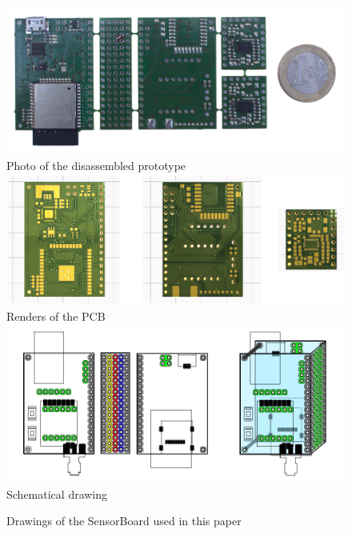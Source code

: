 \begin{figure}
	\centering
	\caption{Drawings of the SensorBoard used in this paper}
	\label{fig:SensorBoardDrawings}
	\includegraphics[width=\linewidth]{img/PCBphoto.jpg}
	\\Photo of the disassembled prototype\\
	\vspace{0.3cm}
	\includegraphics[width=\linewidth]{img/renders.png}
	\vspace{0.3cm}
	\\Renders of the \ac{PCB}\\
	\vspace{0.3cm}
	\includegraphics[scale=1]{img/SensorBoardDrawing.pdf}
	\\Schematical drawing
\end{figure}
